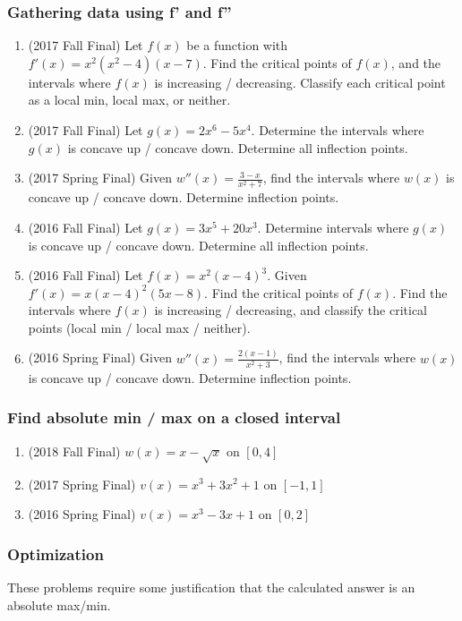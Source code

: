 \documentclass[10pt]{scrartcl}
\begin{document}
\subsubsection{Gathering data using f' and f''}
\begin{enumerate}
\item (2017 Fall Final) Let $f(x)$ be a function with $f'(x) = x^2(x^2-4)(x-7)$. Find the critical points of $f(x)$, and the intervals where $f(x)$ is increasing / decreasing. Classify each critical point as a local min, local max, or neither.
\item (2017 Fall Final) Let $g(x) = 2x^6 - 5x^4$. Determine the intervals where $g(x)$ is concave up / concave down. Determine all inflection points.
\item (2017 Spring Final) Given $w''(x) = \frac{3-x}{x^2 + 7}$, find the intervals where $w(x)$ is concave up / concave down. Determine inflection points.
\item (2016 Fall Final) Let $g(x) = 3x^5 + 20x^3$. Determine intervals where $g(x)$ is concave up / concave down. Determine all inflection points. 
\item (2016 Fall Final) Let $f(x) = x^2 (x-4)^3$. Given $f'(x) = x(x-4)^2(5x-8)$. Find the critical points of $f(x)$. Find the intervals where $f(x)$ is increasing / decreasing, and classify the critical points (local min / local max / neither).
\item (2016 Spring Final) Given $w''(x) = \frac{2(x-1)}{x^2 + 3}$, find the intervals where $w(x)$ is concave up / concave down. Determine inflection points.
\end{enumerate}

\subsubsection{Find absolute min / max on a closed interval}
\begin{enumerate}
\item (2018 Fall Final) $w(x) = x - \sqrt x$ on $[0, 4]$
\item (2017 Spring Final) $v(x) = x^3 + 3x^2 + 1$ on $[-1, 1]$
\item (2016 Spring Final) $v(x) = x^3 - 3x + 1$ on $[0, 2]$
\end{enumerate}

\subsubsection{Optimization}
These problems require some justification that the calculated answer is an absolute max/min.
\end{document}
